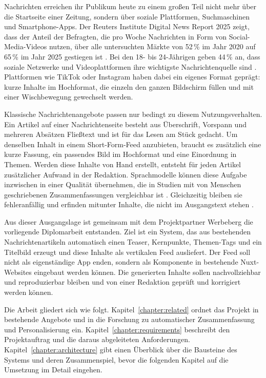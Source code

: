 Nachrichten erreichen ihr Publikum heute zu einem großen Teil nicht mehr über die Startseite einer Zeitung, sondern über soziale Plattformen, Suchmaschinen und Smartphone-Apps.\kihinweis{}
Der Reuters Institute Digital News Report 2025 zeigt, dass der Anteil der Befragten, die pro Woche Nachrichten in Form von Social-Media-Videos nutzen, über alle untersuchten Märkte von 52\,\% im Jahr 2020 auf 65\,\% im Jahr 2025 gestiegen ist \cite{newman2025dnr}.
Bei den 18- bis 24-Jährigen geben 44\,\% an, dass soziale Netzwerke und Videoplattformen ihre wichtigste Nachrichtenquelle sind \cite{newman2025dnr}.
Plattformen wie TikTok oder Instagram haben dabei ein eigenes Format geprägt: kurze Inhalte im Hochformat, die einzeln den ganzen Bildschirm füllen und mit einer Wischbewegung gewechselt werden.

Klassische Nachrichtenangebote passen nur bedingt zu diesem Nutzungsverhalten.
Ein Artikel auf einer Nachrichtenseite besteht aus Überschrift, Vorspann und mehreren Absätzen Fließtext und ist für das Lesen am Stück gedacht.
Um denselben Inhalt in einem Short-Form-Feed anzubieten, braucht es zusätzlich eine kurze Fassung, ein passendes Bild im Hochformat und eine Einordnung in Themen.
Werden diese Inhalte von Hand erstellt, entsteht für jeden Artikel zusätzlicher Aufwand in der Redaktion.
Sprachmodelle können diese Aufgabe inzwischen in einer Qualität übernehmen, die in Studien mit von Menschen geschriebenen Zusammenfassungen vergleichbar ist \cite{zhang2024benchmarking}.
Gleichzeitig bleiben sie fehleranfällig und erfinden mitunter Inhalte, die nicht im Ausgangstext stehen \cite{maynez2020faithfulness}.

Aus dieser Ausgangslage ist gemeinsam mit dem Projektpartner Werbeberg die vorliegende Diplomarbeit entstanden.
Ziel ist ein System, das aus bestehenden Nachrichtenartikeln automatisch einen Teaser, Kernpunkte, Themen-Tags und ein Titelbild erzeugt und diese Inhalte als vertikalen Feed ausliefert.
Der Feed soll nicht als eigenständige App enden, sondern als Komponente in bestehende Nuxt-Websites eingebaut werden können.
Die generierten Inhalte sollen nachvollziehbar und reproduzierbar bleiben und von einer Redaktion geprüft und korrigiert werden können.

Die Arbeit gliedert sich wie folgt.
Kapitel~\ref{chapter:related} ordnet das Projekt in bestehende Angebote und in die Forschung zu automatischer Zusammenfassung und Personalisierung ein.
Kapitel~\ref{chapter:requirements} beschreibt den Projektauftrag und die daraus abgeleiteten Anforderungen.
Kapitel~\ref{chapter:architecture} gibt einen Überblick über die Bausteine des Systems und deren Zusammenspiel, bevor die folgenden Kapitel auf die Umsetzung im Detail eingehen.
